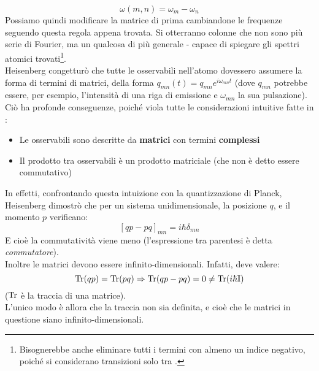 \documentclass[FisicaTeorica.tex]{subfiles}
\begin{document}
\[
\omega(m,n) = \omega_{m} - \omega_n
\]
Possiamo quindi modificare la matrice di prima cambiandone le frequenze seguendo questa regola appena trovata. Si otterranno colonne che non sono più serie di Fourier, ma un qualcosa di più generale - capace di spiegare gli spettri atomici trovati\footnote{Bisognerebbe anche eliminare tutti i termini con almeno un indice negativo, poiché si considerano transizioni solo tra .}.\\
Heisenberg congetturò che tutte le osservabili nell'atomo dovessero assumere la forma di termini di matrici, della forma $q_{mn}(t) = q_{mn}e^{i\omega_{mn}t}$ (dove $q_{mn}$ potrebbe essere, per esempio, l'intensità di una riga di emissione e $\omega_{mn}$ la sua pulsazione).\\
Ciò ha profonde conseguenze, poiché viola tutte le considerazioni intuitive fatte in \MC:
\begin{itemize}
    \item Le osservabili sono descritte da \textbf{matrici} con termini \textbf{complessi}
    \item Il prodotto tra osservabili è un prodotto matriciale (che non è detto essere commutativo)
\end{itemize}
In effetti, confrontando questa intuizione con la quantizzazione di Planck, Heisenberg dimostrò che per un sistema unidimensionale, la posizione $q$, e il momento $p$ verificano:
\[
[qp - pq]_{mn} = i\hbar \delta_{mn}
\]
E cioè la commutatività viene meno (l'espressione tra parentesi è detta \textit{commutatore}).\\
Inoltre le matrici devono essere infinito-dimensionali. Infatti, deve valere:
\[
\operatorname{Tr}(qp) = \operatorname{Tr}(pq) \Rightarrow \operatorname{Tr}(qp-pq) = 0 \neq \operatorname{Tr}(i\hbar \mathbb{I})
\]
($\operatorname{Tr}$ è la traccia di una matrice).\\
L'unico modo è allora che la traccia non sia definita, e cioè che le matrici in questione siano infinito-dimensionali.\\
\end{document}
